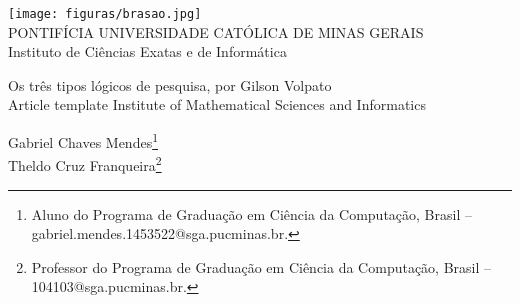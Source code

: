 \documentclass[a4paper,12pt,Times]{article}
\makeatletter
\newcommand{\monog}{Os três tipos lógicos de pesquisa, por Gilson Volpato}
\newcommand{\monogES}{Article template Institute of Mathematical Sciences and Informatics}
\newcommand{\origem}{Brasil }
\newcommand{\AutorA}{Gabriel Chaves Mendes}
\newcommand{\funcaoA}{}
\newcommand{\emailA}{gabriel.mendes.1453522@sga.pucminas.br}
\newcommand{\cursA}{Aluno do Programa de Graduação em Ciência da Computação}
\newcommand{\AutorB}{Theldo Cruz Franqueira}
\newcommand{\funcaoB}{}
\newcommand{\emailB}{104103@sga.pucminas.br}
\newcommand{\cursB}{Professor do Programa de Graduação em Ciência da Computação}
\newcommand{\keyword}[1]{\textsf{#1}}
\makeatother
\begin{document}

\begin{center}
\texttt{[image: figuras/brasao.jpg]} \\
PONTIFÍCIA UNIVERSIDADE CATÓLICA DE MINAS GERAIS \\
Instituto de Ciências Exatas e de Informática


\end{center}

 \vspace{0cm} {
 \singlespacing \Large{\monog {} \\ }
  \normalsize{\monogES}
 }

\vspace{1.0cm}

\begin{flushright}
\singlespacing 
\normalsize{\AutorA \footnote{\funcaoA \cursA, \origem -- \emailA . }} \\
\normalsize{\AutorB \footnote{\funcaoB \cursB, \origem -- \emailB . }} \\
\end{flushright}
\thispagestyle{empty}

\vspace{1.0cm}

\begin{abstract}
\noindent
O vídeo criado por Gilson Volpato, apresenta três tipos de lógicas de pesquisa para artigos científicos, sendo eles argumentos com hispóteses e sem hipóteses, para auxiliar no desenvolver de uma pergunta ou questionamento. Este vídeo argumenta também sobre a importancia dos textos científicos como forma de expressão lógica e argumentativa, pois em resumo, ele ajuda a desempenhar um papel na construção do argumento cinetífico, por meio do uso ou não de hipóteses. Ao longo do vídeo, ele demostra que essas hipóteses são criadas durante o dia a dia, observando e analisando situações, elas podem ser associadas no desenvolver de outra hipótese ou interferir  neste processo, mas ajudando a desvendar questões que futuramente podem vir a ser argumentos científicos. Mas, em algumas situações não a há hipóteses associadas a pergunta, sendo necessário a avaliação de apenas uma variável.
\\\textbf{\keyword{Palavras-chave: }} Hipótese. Artigo. Científico
\end{abstract}
\end{document}
